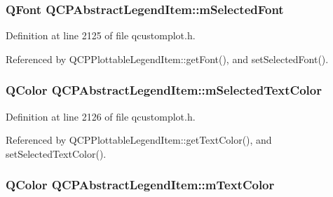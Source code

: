 \subsubsection[{m\+Selected\+Font}]{\setlength{\rightskip}{0pt plus 5cm}Q\+Font Q\+C\+P\+Abstract\+Legend\+Item\+::m\+Selected\+Font\hspace{0.3cm}{\ttfamily [protected]}}\label{class_q_c_p_abstract_legend_item_ab971df604306b192875a7d097feb1e21}


Definition at line 2125 of file qcustomplot.\+h.



Referenced by Q\+C\+P\+Plottable\+Legend\+Item\+::get\+Font(), and set\+Selected\+Font().

\hypertarget{class_q_c_p_abstract_legend_item_a4965c13854d970b24c284f0a4f005fbd}{}
\subsubsection[{m\+Selected\+Text\+Color}]{\setlength{\rightskip}{0pt plus 5cm}Q\+Color Q\+C\+P\+Abstract\+Legend\+Item\+::m\+Selected\+Text\+Color\hspace{0.3cm}{\ttfamily [protected]}}\label{class_q_c_p_abstract_legend_item_a4965c13854d970b24c284f0a4f005fbd}


Definition at line 2126 of file qcustomplot.\+h.



Referenced by Q\+C\+P\+Plottable\+Legend\+Item\+::get\+Text\+Color(), and set\+Selected\+Text\+Color().

\hypertarget{class_q_c_p_abstract_legend_item_a974b21e9930227d281344bd2242d289d}{}
\subsubsection[{m\+Text\+Color}]{\setlength{\rightskip}{0pt plus 5cm}Q\+Color Q\+C\+P\+Abstract\+Legend\+Item\+::m\+Text\+Color\hspace{0.3cm}{\ttfamily [protected]}}\label{class_q_c_p_abstract_legend_item_a974b21e9930227d281344bd2242d289d}


